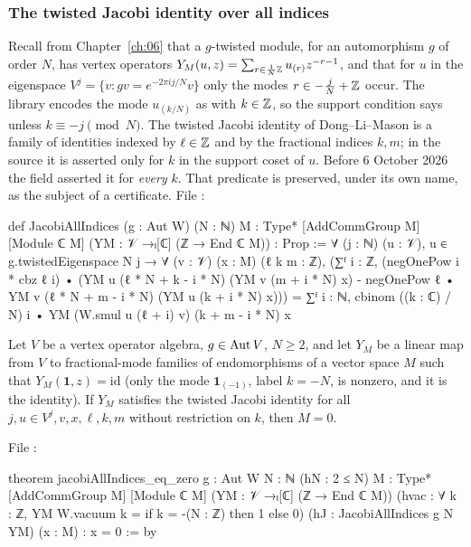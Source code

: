 \subsubsection{The twisted Jacobi identity over all indices}\label{ch15:sec:twisted}

Recall from Chapter~\ref{ch:06} that a $g$-twisted module, for an automorphism $g$ of order $N$,
has vertex operators $Y_M(u,z)=\sum_{r\in\frac1N{\mathbb{Z}}}u_{(r)}z^{-r-1}$, and that for $u$ in the
eigenspace $V^j=\{v: gv=e^{-2\pi i j/N}v\}$ only the modes $r\in -\frac jN+{\mathbb{Z}}$ occur. The library
encodes the mode $u_{(k/N)}$ as  with $k\in{\mathbb{Z}}$, so the support condition says
 unless $k\equiv -j\pmod N$. The twisted Jacobi identity of Dong--Li--Mason is a
family of identities indexed by $\ell\in{\mathbb{Z}}$ and by the fractional indices $k,m$; in the source it is
asserted only for $k$ in the support coset of $u$. Before 6 October 2026 the field
 asserted it for \emph{every} $k$. That predicate is preserved, under its
own name, as the subject of a certificate. File :
\begin{leancode}
def JacobiAllIndices (g : Aut W) (N : ℕ) {M : Type*} [AddCommGroup M] [Module ℂ M]
    (YM : 𝒱 →ₗ[ℂ] (ℤ → End ℂ M)) : Prop :=
  ∀ (j : ℕ) (u : 𝒱), u ∈ g.twistedEigenspace N j → ∀ (v : 𝒱) (x : M) (ℓ k m : ℤ),
    (∑ᶠ i : ℤ, (negOnePow i * cbz ℓ i) •
        (YM u (ℓ * N + k - i * N) (YM v (m + i * N) x)
          - negOnePow ℓ • YM v (ℓ * N + m - i * N) (YM u (k + i * N) x)))
      = ∑ᶠ i : ℕ, cbinom ((k : ℂ) / N) i • YM (W.smul u (ℓ + i) v) (k + m - i * N) x
\end{leancode}

\begin{theorem}[The all-indices twisted Jacobi identity forces $M=0$]\label{ch15:thm:jacobiAll}
Let $V$ be a vertex operator algebra, $g\in\operatorname{Aut} V$, $N\ge 2$, and let $Y_M$ be a linear map from $V$
to fractional-mode families of endomorphisms of a vector space $M$ such that $Y_M(\mathbf 1,z)=\mathrm{id}$
(only the mode $\mathbf 1_{(-1)}$, label $k=-N$, is nonzero, and it is the identity). If $Y_M$
satisfies the twisted Jacobi identity for all $j,u\in V^j,v,x,\ell,k,m$ without restriction on $k$,
then $M=0$.
\end{theorem}

File :
\begin{leancode}
theorem jacobiAllIndices_eq_zero {g : Aut W} {N : ℕ} (hN : 2 ≤ N) {M : Type*}
    [AddCommGroup M] [Module ℂ M] (YM : 𝒱 →ₗ[ℂ] (ℤ → End ℂ M))
    (hvac : ∀ k : ℤ, YM W.vacuum k = if k = -(N : ℤ) then 1 else 0)
    (hJ : JacobiAllIndices g N YM) (x : M) : x = 0 := by
\end{leancode}

